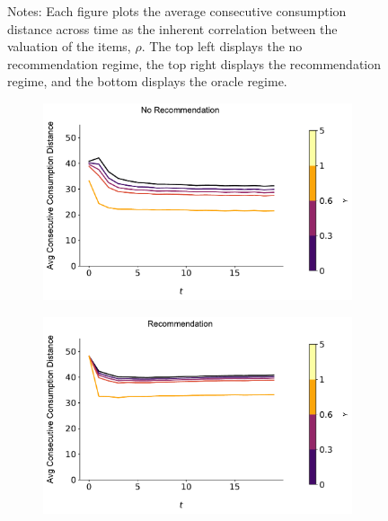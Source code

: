 \documentclass[format=acmsmall, review=true]{acmart}
\begin{document}
\begin{figure}[H]
\begin{subfigure}{.45\textwidth}
\end{subfigure}
\caption*{\scriptsize Notes: Each figure plots the average consecutive consumption distance across time as the inherent correlation between the valuation of the items, $\rho$. The top left displays the no recommendation regime, the top right displays the recommendation regime, and the bottom displays the oracle regime.}
\label{fig:local_consumption_across_rho}
\end{figure}
\addtocounter{figure}{-1}

\begin{figure}[H]
\caption{Relationship between Local Consumption and $\gamma$, $N = 200$}
\begin{subfigure}{.45\textwidth}
\includegraphics[width=\linewidth]{figures/gamma_consumption_dist_N_200T_20.pdf}
\end{subfigure}
\begin{subfigure}{.45\textwidth}
\includegraphics[width=\linewidth]{figures/gamma_consumption_dist_N_200T_20_partial.pdf}

\end{subfigure}
\end{figure}
\end{document}
